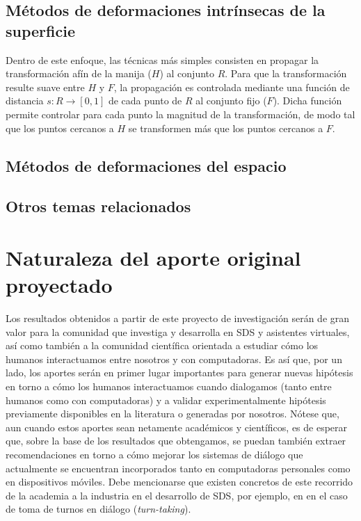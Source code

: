 \documentclass{article}
\begin{document}
\subsection{Métodos de deformaciones intrínsecas de la superficie}
Dentro de este enfoque, las técnicas más simples consisten en 
propagar la transformación afín de la manija ($H$) al conjunto 
$R$. Para que la transformación resulte suave entre $H$ y $F$, la propagación 
es controlada mediante una función de distancia $s: R \rightarrow [0,1]$ 
de cada punto de $R$ al conjunto fijo ($F$). Dicha función permite controlar 
para cada punto la magnitud de la transformación, de modo tal que los puntos 
cercanos a $H$ se transformen más que los puntos cercanos a $F$.


\subsection{Métodos de deformaciones del espacio}

\subsection{Otros temas relacionados}


\section{Naturaleza del aporte original proyectado}

Los resultados obtenidos a partir de este proyecto de investigación serán de gran valor para la comunidad que investiga y desarrolla en SDS y asistentes virtuales, así como también a la comunidad científica orientada a estudiar cómo los humanos interactuamos entre nosotros y con computadoras. Es así que, por un lado, los aportes serán en primer lugar importantes para generar nuevas hipótesis en torno a cómo los humanos interactuamos cuando dialogamos (tanto entre humanos como con computadoras) y a validar experimentalmente hipótesis previamente disponibles en la literatura o generadas por nosotros. Nótese que, aun cuando estos aportes sean netamente académicos y científicos, es de esperar que, sobre la base de los resultados que obtengamos, se puedan también extraer recomendaciones en torno a cómo mejorar los sistemas de diálogo que actualmente se encuentran incorporados tanto en computadoras personales como en dispositivos móviles. Debe mencionarse que existen concretos de este recorrido de la academia a la industria en el desarrollo de SDS, por ejemplo, en en el caso de toma de turnos en diálogo (\textit{turn-taking}).
\end{document}
